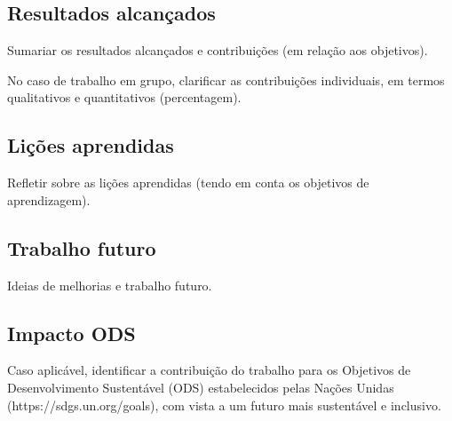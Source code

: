 \documentclass[10pt]{article}
\begin{document}
	
\subsection{Resultados alcançados} 	
 Sumariar os resultados alcançados e contribuições (em relação aos objetivos).
	
 No caso de trabalho em grupo, clarificar as contribuições individuais, em termos qualitativos e quantitativos (percentagem).
\subsection{Lições aprendidas} 	
 Refletir sobre as lições aprendidas (tendo em conta os objetivos de aprendizagem).
	
\subsection{Trabalho futuro} 
 
 Ideias de melhorias e trabalho futuro. 

\subsection{Impacto ODS}

Caso aplicável, identificar a contribuição do trabalho para os Objetivos de Desenvolvimento Sustentável (ODS) estabelecidos pelas
Nações Unidas (https://sdgs.un.org/goals), com vista a um futuro mais sustentável e inclusivo. 


 
 
\end{document}
